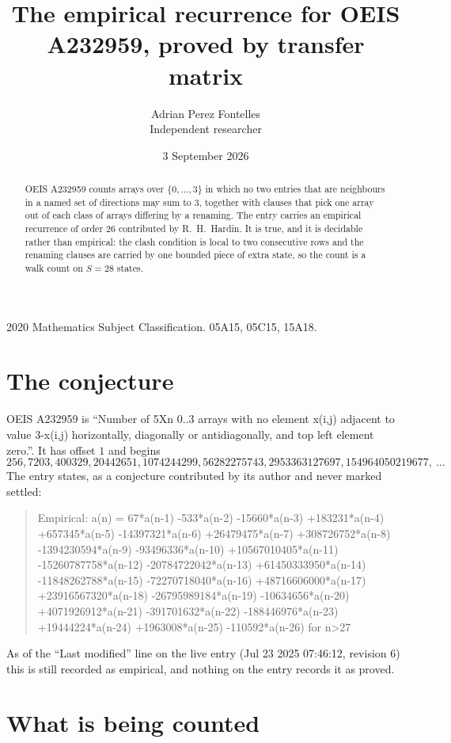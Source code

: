 \documentclass[11pt,a4paper]{article}
\title{The empirical recurrence for OEIS A232959, proved by transfer matrix}
\author{Adrian Perez Fontelles\\ \small Independent researcher}
\date{3 September 2026}
\theoremstyle{plain}
\theoremstyle{definition}
\begin{document}
\maketitle

\begin{abstract}
OEIS A232959 counts arrays over $\{0,\dots,3\}$ in which no two entries that are neighbours in
a named set of directions may sum to $3$, together with clauses that pick one array out of
each class of arrays differing by a renaming. The entry carries an empirical recurrence of
order $26$ contributed by R.~H.~Hardin. It is true, and it is decidable rather than
empirical: the clash condition is local to two consecutive rows and the renaming clauses are
carried by one bounded piece of extra state, so the count is a walk count on $S=28$ states.
\end{abstract}

\noindent\small 2020 Mathematics Subject Classification. 05A15, 05C15, 15A18.\normalsize

\section{The conjecture}

OEIS A232959 is ``Number of 5Xn 0..3 arrays with no element x(i,j) adjacent to value 3-x(i,j) horizontally, diagonally or antidiagonally, and top left element zero.''. It has offset $1$ and begins
\[
256, 7203, 400329, 20442651, 1074244299, 56282275743, 2953363127697, 154964050219677,\ \dots
\]
The entry states, as a conjecture contributed by its author and never marked settled:
\begin{quote}
Empirical: a(n) = 67*a(n-1) -533*a(n-2) -15660*a(n-3) +183231*a(n-4) +657345*a(n-5) -14397321*a(n-6) +26479475*a(n-7) +308726752*a(n-8) -1394230594*a(n-9) -93496336*a(n-10) +10567010405*a(n-11) -15260787758*a(n-12) -20784722042*a(n-13) +61450333950*a(n-14) -11848262788*a(n-15) -72270718040*a(n-16) +48716606000*a(n-17) +23916567320*a(n-18) -26795989184*a(n-19) -10634656*a(n-20) +4071926912*a(n-21) -391701632*a(n-22) -188446976*a(n-23) +19444224*a(n-24) +1963008*a(n-25) -110592*a(n-26) for n>27
\end{quote}
As of the ``Last modified'' line on the live entry (Jul 23 2025 07:46:12, revision 6) this is still
recorded as empirical, and nothing on the entry records it as proved.

\section{What is being counted}
\end{document}
